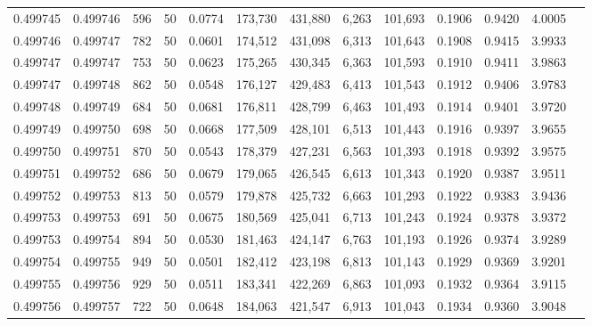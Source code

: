 \begin{tabular}{rrrrrrrrrrrrr}
0.499745 & 0.499746 &   596 &  50 &                                     0.0774 & 173,730 & 431,880 &   6,263 & 101,693 & 0.1906 & 0.9420 & 4.0005 \\
0.499746 & 0.499747 &   782 &  50 &                                     0.0601 & 174,512 & 431,098 &   6,313 & 101,643 & 0.1908 & 0.9415 & 3.9933 \\
0.499747 & 0.499747 &   753 &  50 &                                     0.0623 & 175,265 & 430,345 &   6,363 & 101,593 & 0.1910 & 0.9411 & 3.9863 \\
0.499747 & 0.499748 &   862 &  50 &                                     0.0548 & 176,127 & 429,483 &   6,413 & 101,543 & 0.1912 & 0.9406 & 3.9783 \\
0.499748 & 0.499749 &   684 &  50 &                                     0.0681 & 176,811 & 428,799 &   6,463 & 101,493 & 0.1914 & 0.9401 & 3.9720 \\
0.499749 & 0.499750 &   698 &  50 &                                     0.0668 & 177,509 & 428,101 &   6,513 & 101,443 & 0.1916 & 0.9397 & 3.9655 \\
0.499750 & 0.499751 &   870 &  50 &                                     0.0543 & 178,379 & 427,231 &   6,563 & 101,393 & 0.1918 & 0.9392 & 3.9575 \\
0.499751 & 0.499752 &   686 &  50 &                                     0.0679 & 179,065 & 426,545 &   6,613 & 101,343 & 0.1920 & 0.9387 & 3.9511 \\
0.499752 & 0.499753 &   813 &  50 &                                     0.0579 & 179,878 & 425,732 &   6,663 & 101,293 & 0.1922 & 0.9383 & 3.9436 \\
0.499753 & 0.499753 &   691 &  50 &                                     0.0675 & 180,569 & 425,041 &   6,713 & 101,243 & 0.1924 & 0.9378 & 3.9372 \\
0.499753 & 0.499754 &   894 &  50 &                                     0.0530 & 181,463 & 424,147 &   6,763 & 101,193 & 0.1926 & 0.9374 & 3.9289 \\
0.499754 & 0.499755 &   949 &  50 &                                     0.0501 & 182,412 & 423,198 &   6,813 & 101,143 & 0.1929 & 0.9369 & 3.9201 \\
0.499755 & 0.499756 &   929 &  50 &                                     0.0511 & 183,341 & 422,269 &   6,863 & 101,093 & 0.1932 & 0.9364 & 3.9115 \\
0.499756 & 0.499757 &   722 &  50 &                                     0.0648 & 184,063 & 421,547 &   6,913 & 101,043 & 0.1934 & 0.9360 & 3.9048 \\

\end{tabular}
